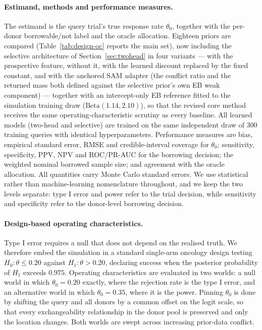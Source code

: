 \documentclass[11pt]{article}
\begin{document}
\paragraph{Estimand, methods and performance measures.} The estimand is the
query trial's true response rate $\theta_0$, together with the per-donor
borrowable/not label and the oracle allocation. Eighteen priors are compared
(Table~\ref{tab:design-oc} reports the main set), now including the selective
architecture of Section~\ref{sec:twohead} in four variants --- with the
prospective feature, without it, with the learned discount replaced by the
fixed constant, and with the anchored SAM adapter (the conflict ratio and the
returned mass both defined against the selective prior's own EB weak
component) --- together with an intercept-only EB reference fitted to the
simulation training draw ($\mathrm{Beta}(1.14, 2.10)$), so that the revised
core method receives the same operating-characteristic scrutiny as every
baseline. All learned models (two-head and selective) are trained on the same
independent draw of $300$ training queries with identical
hyperparameters. Performance measures are bias, empirical standard error, RMSE and
credible-interval coverage for $\theta_0$; sensitivity, specificity, PPV, NPV
and ROC/PR-AUC for the borrowing decision; the weighted nominal borrowed
sample size; and
agreement with the oracle allocation. All quantities carry Monte Carlo standard
errors. We use statistical rather than machine-learning nomenclature throughout,
and we keep the two levels separate: type I error and power refer to the trial
decision, while sensitivity and specificity refer to the donor-level borrowing
decision.

\paragraph{Design-based operating characteristics.} Type I error requires a
null that does not depend on the realised truth. We therefore embed the
simulation in a standard single-arm oncology design testing
$H_0\!:\theta \le 0.20$ against $H_1\!:\theta > 0.20$, declaring success when the
posterior probability of $H_1$ exceeds $0.975$. Operating characteristics are
evaluated in two worlds: a null world in which $\theta_0 = 0.20$ exactly, where
the rejection rate is the type I error, and an alternative world in which
$\theta_0 = 0.35$, where it is the power. Pinning $\theta_0$ is done by shifting
the query and all donors by a common offset on the logit scale, so that every
exchangeability relationship in the donor pool is preserved and only the
location changes. Both worlds are swept across increasing prior-data conflict.
\end{document}
